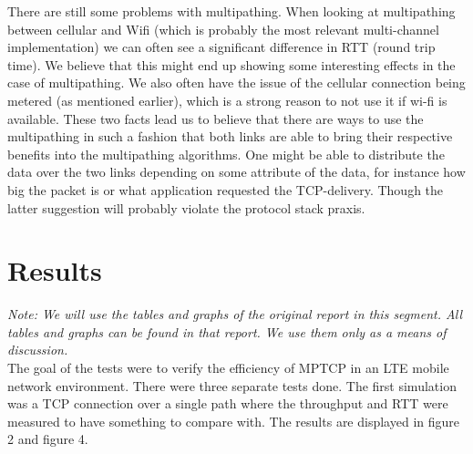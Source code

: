 \documentclass[11pt,twocolumn]{article}
\begin{document}
There are still some problems with multipathing. When looking at multipathing between cellular and Wifi (which is probably the most relevant multi-channel implementation) we can often see a significant difference in RTT (round trip time). We believe that this might end up showing some interesting effects in the case of multipathing. We also often have the issue of the cellular connection being metered (as mentioned earlier), which is a strong reason to not use it if wi-fi is available. These two facts lead us to believe that there are ways to use the multipathing in such a fashion that both links are able to bring their respective benefits into the multipathing algorithms. One might be able to distribute the data over the two links depending on some attribute of the data, for instance how big the packet is or what application requested the TCP-delivery. Though the latter suggestion will probably violate the protocol stack praxis.

\section{Results}

\emph{Note: We will use the tables and graphs of the original report\cite{MPTCP-LTE} in this segment. All tables and graphs can be found in that report. We use them only as a means of discussion.} \\

The goal of the tests were to verify the efficiency of MPTCP in an LTE mobile network environment. There were three separate tests done. The first simulation was a TCP connection over a single path where the throughput and RTT were measured to have something to compare with. The results are displayed in figure 2 and figure 4.
\end{document}
